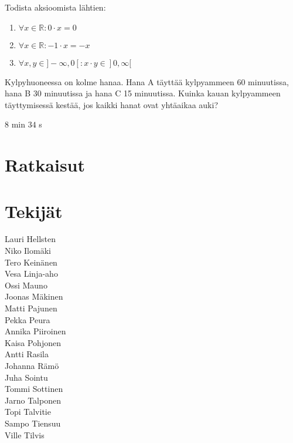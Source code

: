\begin{tehtava}
Todista aksioomista lähtien:
\begin{enumerate}[(1)]
\item $\forall x \in \mathbb{R}: 0 \cdot x = 0$
\item $\forall x \in \mathbb{R}: -1 \cdot x = -x$
\item $\forall x, y \in ]-\infty,0[: x \cdot y \in ]0,\infty[$
\end{enumerate}
\begin{vastaus}
\begin{enumerate}[(1)]
\end{enumerate}
\end{vastaus}
\end{tehtava}

\begin{tehtava}
Kylpyhuoneessa on kolme hanaa. Hana A täyttää kylpyammeen 60 minuutissa, hana B 30 minuutissa ja hana C 15 minuutissa. Kuinka kauan kylpyammeen täyttymisessä kestää, jos kaikki hanat ovat yhtäaikaa auki?
\begin{vastaus}
$8$ min $34$ s
\end{vastaus}
\end{tehtava}

\chapter{Ratkaisut}


\chapter{Tekijät}

Lauri Hellsten\\
Niko Ilomäki\\
Tero Keinänen\\
Vesa Linja-aho\\
Ossi Mauno\\
Joonas Mäkinen\\
Matti Pajunen\\
Pekka Peura\\
Annika Piiroinen\\
Kaisa Pohjonen\\
Antti Rasila\\
Johanna Rämö\\
Juha Sointu\\
Tommi Sottinen\\
Jarno Talponen\\
Topi Talvitie\\
Sampo Tiensuu\\
Ville Tilvis

